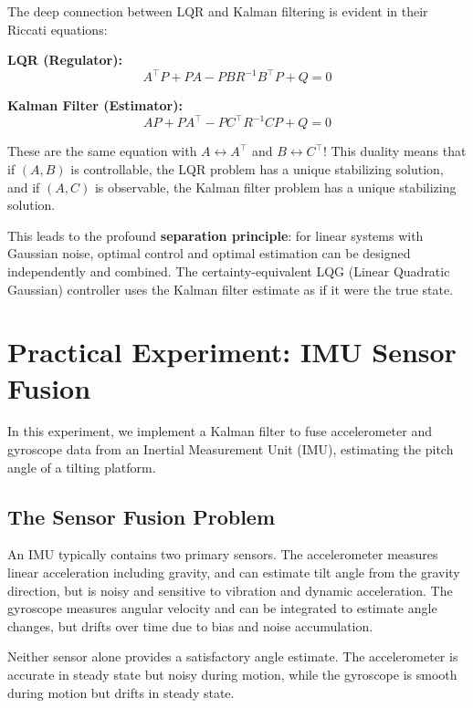 The deep connection between LQR and Kalman filtering is evident in their Riccati equations:

\textbf{LQR (Regulator):}
\begin{equation}
A^\top P + PA - PBR^{-1}B^\top P + Q = 0
\end{equation}

\textbf{Kalman Filter (Estimator):}
\begin{equation}
AP + PA^\top - PC^\top R^{-1}CP + Q = 0
\end{equation}

These are the same equation with $A \leftrightarrow A^\top$ and $B \leftrightarrow C^\top$! This duality means that if $(A, B)$ is controllable, the LQR problem has a unique stabilizing solution, and if $(A, C)$ is observable, the Kalman filter problem has a unique stabilizing solution.

This leads to the profound \textbf{separation principle}: for linear systems with Gaussian noise, optimal control and optimal estimation can be designed independently and combined. The certainty-equivalent LQG (Linear Quadratic Gaussian) controller uses the Kalman filter estimate as if it were the true state.

\section{Practical Experiment: IMU Sensor Fusion}

In this experiment, we implement a Kalman filter to fuse accelerometer and gyroscope data from an Inertial Measurement Unit (IMU), estimating the pitch angle of a tilting platform.

\subsection{The Sensor Fusion Problem}

An IMU typically contains two primary sensors. The accelerometer measures linear acceleration including gravity, and can estimate tilt angle from the gravity direction, but is noisy and sensitive to vibration and dynamic acceleration. The gyroscope measures angular velocity and can be integrated to estimate angle changes, but drifts over time due to bias and noise accumulation.

Neither sensor alone provides a satisfactory angle estimate. The accelerometer is accurate in steady state but noisy during motion, while the gyroscope is smooth during motion but drifts in steady state.

